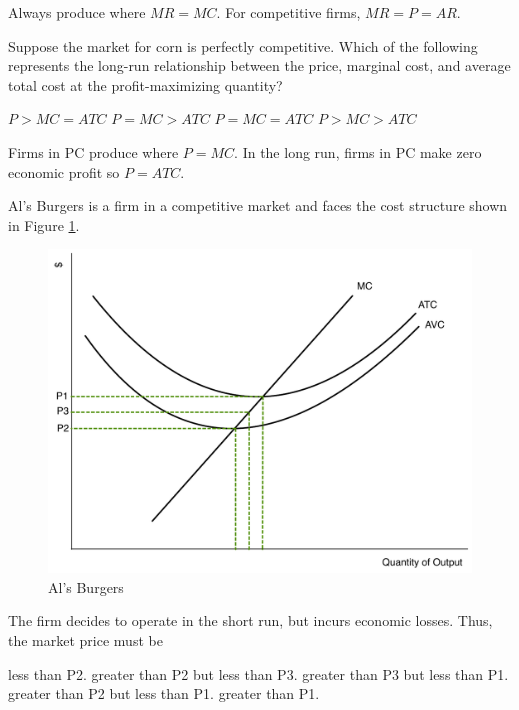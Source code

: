 \documentclass[addpoints,11pt]{exam}
\theoremstyle{definition}
\begin{document}
\begin{questions}
	\begin{solution}
		Always produce where $MR = MC$. For competitive firms, $MR = P = AR$.
	\end{solution}
	
		\question Suppose the market for corn is perfectly competitive. Which of the following represents the long-run relationship between the price, marginal cost, and average total cost at the profit-maximizing quantity?
		
		\begin{choices}
			\choice $P > MC = ATC$
			\choice $P = MC > ATC$ 
			\CorrectChoice $P = MC = ATC$
			\choice $P > MC > ATC$
		\end{choices}
		
		\begin{solution}
			Firms in PC produce where $P = MC$. In the long run, firms in PC make zero economic profit so $P=ATC$.
		\end{solution}

	\question Al's Burgers is a firm in a competitive market and faces the cost structure shown in Figure \ref{MC28}.
				
				\begin{figure}[H]
					\centering
					\includegraphics[scale=.45]{Exam1_MC27.pdf}
					\caption{Al's Burgers}
					\label{MC28}
				\end{figure}
				
				The firm decides to operate in the short run, but incurs economic losses. Thus, the market price must be 
				
				\begin{choices}
					\choice less than P2.
					\choice greater than P2 but less than P3.
					\choice greater than P3 but less than P1.
					\CorrectChoice greater than P2 but less than P1.
					\choice greater than P1.
				\end{choices}
				

\end{questions}
\end{document}
